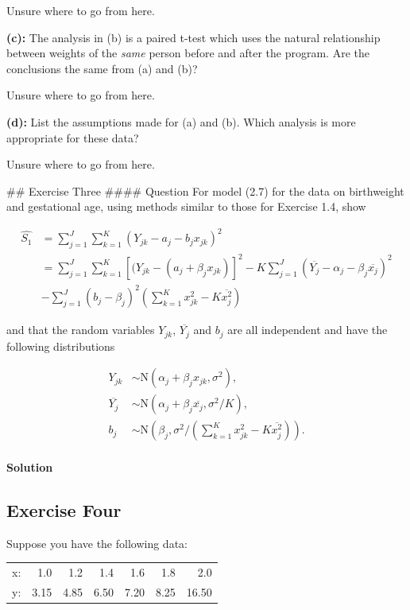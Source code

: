 \documentclass[]{article}
\let\oldparagraph\paragraph
\renewcommand{\paragraph}[1]{\oldparagraph{#1}\mbox{}}
\begin{document}
Unsure where to go from here.

\textbf{(c):} The analysis in (b) is a paired t-test which uses the
natural relationship between weights of the \emph{same} person before
and after the program. Are the conclusions the same from (a) and (b)?

Unsure where to go from here.

\textbf{(d):} List the assumptions made for (a) and (b). Which analysis
is more appropriate for these data?

Unsure where to go from here.

\pagebreak
\#\# Exercise Three \#\#\#\# Question For model (2.7) for the data on
birthweight and gestational age, using methods similar to those for
Exercise 1.4, show

\begin{align*}
\hat{S_1} &= \sum_{j=1}^J\sum_{k=1}^K(Y_{jk} - a_j - b_jx_{jk})^2\\
&= \sum_{j=1}^J\sum_{k=1}^K[(Y_{jk} - (a_j + \beta_jx_{jk})]^2 - K\sum_{j=1}^J(\overline{Y_j} - \alpha_j - \beta_j\overline{x_j})^2\\
&-\sum_{j=1}^J(b_j - \beta_j)^2(\sum_{k=1}^K x_{jk}^2 - K\overline{x_j^2})
\end{align*}

and that the random variables \(Y_{jk}\), \(\overline{Y_j}\) and \(b_j\)
are all independent and have the following distributions

\begin{align*}
Y_{jk} &\sim \text{N}(\alpha_j + \beta_jx_{jk}, \sigma^2),   \\
\overline{Y_j} &\sim \text{N}(\alpha_j + \beta_j\overline{x_j}, \sigma^2/K),    \\
b_j &\sim \text{N}(\beta_j, \sigma^2/(\sum_{k=1}^K x_{jk}^2 - K\overline{x^2_j})).
\end{align*}

\paragraph{Solution}\label{solution-1}

\subsection{Exercise Four}\label{exercise-four}

Suppose you have the following data:

\begin{center}
\begin{tabular}{lrrrrrr}
\hline
x: & 1.0  & 1.2  & 1.4  & 1.6  & 1.8  & 2.0   \\
y: & 3.15 & 4.85 & 6.50 & 7.20 & 8.25 & 16.50 \\ \hline
\end{tabular}
\end{center}
\end{document}
